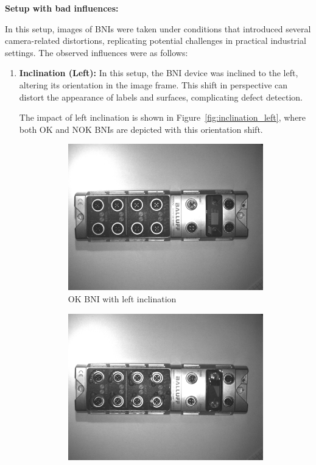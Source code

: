 \documentclass[12pt,DIV14,BCOR12mm,a4paper,footinclude=false,headinclude,parskip=half-,twoside,openright,cleardoublepage=empty,toc=index,bibliography=totoc,listof=totoc]{scrreprt}
\numberwithin{equation}{chapter}
\begin{document}
\textbf{Setup with bad influences:}

In this setup, images of BNIs were taken under conditions that introduced several camera-related distortions, replicating potential challenges in practical industrial settings. The observed influences were as follows:
\begin{enumerate}
    \item \textbf{Inclination (Left):} In this setup, the BNI device was inclined to the left, altering its orientation in the image frame. This shift in perspective can distort the appearance of labels and surfaces, complicating defect detection. 
    
	The impact of left inclination is shown in Figure~\ref{fig:inclination_left}, where both OK and NOK BNIs are depicted with this orientation shift.
    \begin{figure}
        \centering
        \begin{subfigure}[b]{0.45\textwidth}
            \centering
            \includegraphics[scale=0.15]{../media/BNI-influence-left-OK.png}
            \caption{OK BNI with left inclination}
        \end{subfigure}
        \hfill
        \begin{subfigure}[b]{0.45\textwidth}
            \centering
            \includegraphics[scale=0.15]{../media/BNI-influence-left-NOK.png}

\end{subfigure}
\end{figure}
\end{enumerate}
\end{document}
